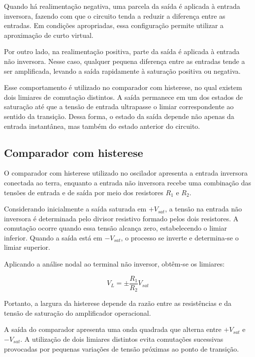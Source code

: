 \documentclass[11pt,a4paper]{article}
\begin{document}
Quando há realimentação negativa, uma parcela da saída é aplicada à entrada inversora, fazendo com que o circuito tenda a reduzir a diferença entre as entradas. Em condições apropriadas, essa configuração permite utilizar a aproximação de curto virtual.

Por outro lado, na realimentação positiva, parte da saída é aplicada à entrada não inversora. Nesse caso, qualquer pequena diferença entre as entradas tende a ser amplificada, levando a saída rapidamente à saturação positiva ou negativa.

Esse comportamento é utilizado no comparador com histerese, no qual existem dois limiares de comutação distintos. A saída permanece em um dos estados de saturação até que a tensão de entrada ultrapasse o limiar correspondente ao sentido da transição. Dessa forma, o estado da saída depende não apenas da entrada instantânea, mas também do estado anterior do circuito.

\subsection{Comparador com histerese}

O comparador com histerese utilizado no oscilador apresenta a entrada inversora conectada ao terra, enquanto a entrada não inversora recebe uma combinação das tensões de entrada e de saída por meio dos resistores $R_1$ e $R_2$.

Considerando inicialmente a saída saturada em $+V_{sat}$, a tensão na entrada não inversora é determinada pelo divisor resistivo formado pelos dois resistores. A comutação ocorre quando essa tensão alcança zero, estabelecendo o limiar inferior. Quando a saída está em $-V_{sat}$, o processo se inverte e determina-se o limiar superior.

Aplicando a análise nodal ao terminal não inversor, obtêm-se os limiares:

\begin{equation}
V_L=\pm\frac{R_1}{R_2}V_{sat}
\label{eq:limiares}
\end{equation}

Portanto, a largura da histerese depende da razão entre as resistências e da tensão de saturação do amplificador operacional.

A saída do comparador apresenta uma onda quadrada que alterna entre $+V_{sat}$ e $-V_{sat}$. A utilização de dois limiares distintos evita comutações sucessivas provocadas por pequenas variações de tensão próximas ao ponto de transição.
\end{document}
